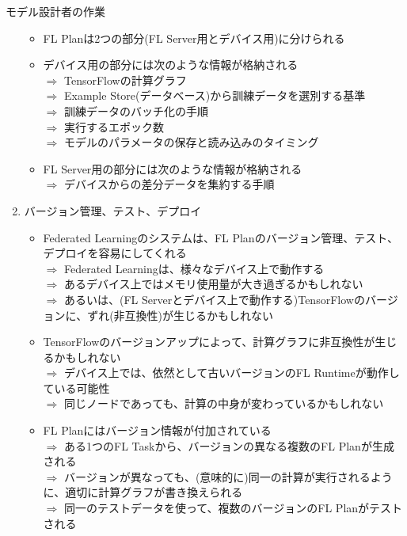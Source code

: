 \documentclass[dvipdfmx,notheorems,t]{beamer}
\begin{document}
\begin{frame}{モデル設計者の作業}
\begin{enumerate}
\begin{itemize}
		\item FL Planは2つの部分(FL Server用とデバイス用)に分けられる
		\newline
		
		\item デバイス用の部分には次のような情報が格納される \\
		$\Rightarrow$ TensorFlowの計算グラフ \\
		$\Rightarrow$ Example Store(データベース)から訓練データを選別する基準 \\
		$\Rightarrow$ 訓練データのバッチ化の手順 \\
		$\Rightarrow$ 実行するエポック数 \\
		$\Rightarrow$ モデルのパラメータの保存と読み込みのタイミング
		\newline
		
		\item FL Server用の部分には次のような情報が格納される \\
		$\Rightarrow$ デバイスからの差分データを集約する手順
	\end{itemize}
	
	\framebreak
	
	\item バージョン管理、テスト、デプロイ
	\begin{itemize}
		\item Federated Learningのシステムは、FL Planのバージョン管理、テスト、デプロイを容易にしてくれる \\
		$\Rightarrow$ Federated Learningは、様々なデバイス上で動作する \\
		$\Rightarrow$ あるデバイス上ではメモリ使用量が大き過ぎるかもしれない \\
		$\Rightarrow$ あるいは、(FL Serverとデバイス上で動作する)TensorFlowのバージョンに、ずれ(非互換性)が生じるかもしれない
		\newline
		
		\item TensorFlowのバージョンアップによって、計算グラフに非互換性が生じるかもしれない \\
		$\Rightarrow$ デバイス上では、依然として古いバージョンのFL Runtimeが動作している可能性 \\
		$\Rightarrow$ 同じノードであっても、計算の中身が変わっているかもしれない
		\newline
		
		\item FL Planにはバージョン情報が付加されている \\
		$\Rightarrow$ ある1つのFL Taskから、バージョンの異なる複数のFL Planが生成される \\
		$\Rightarrow$ バージョンが異なっても、(意味的に)同一の計算が実行されるように、適切に計算グラフが書き換えられる \\
		$\Rightarrow$ 同一のテストデータを使って、複数のバージョンのFL Planがテストされる
		\newline
		

\end{itemize}
\end{enumerate}
\end{frame}
\end{document}

